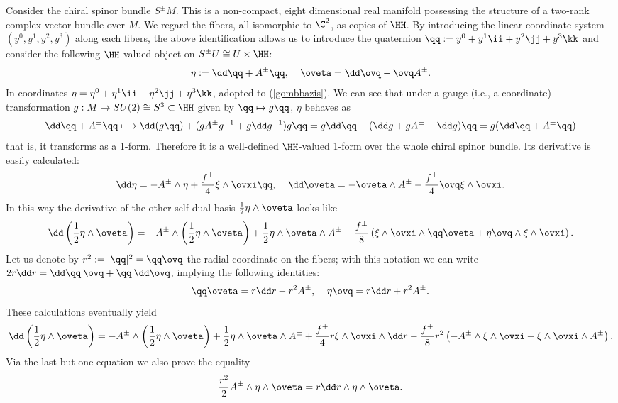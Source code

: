 \documentclass[a4paper,12pt,draft]{article}
\begin{document}
Consider the chiral spinor bundle $S^\pm M$. This is a non-compact, 
eight dimensional real manifold possessing
the structure of a two-rank complex vector bundle over $M$. We regard the 
fibers, all isomorphic to $\C^2$, as copies of $\HH$. By introducing the
linear coordinate system $(y^0, y^1, y^2, y^3)$ along each fibers, the
above identification allows us to introduce the quaternion $\qq
:=y^0+y^1\ii +y^2\jj +y^3\kk$ and consider the following $\HH$-valued
object on $S^\pm U\cong U\times\HH$: 
\[\eta :=\dd\qq +A^\pm\qq,\:\:\:\:\:\oveta =\dd\ovq -\ovq A^\pm .\]
In coordinates $\eta =\eta^0+\eta^1\ii +\eta^2\jj +\eta^3\kk$, adopted to 
(\ref{gombbazis}). We can see that under a gauge (i.e., a coordinate) 
transformation $g: M\rightarrow SU(2)\cong S^3\subset\HH$ given by
$\qq\mapsto g\qq$, $\eta$ behaves as
\[\dd\qq +A^\pm\qq\longmapsto \dd(g\qq )+(gA^\pm g^{-1}+g\dd g^{-1})g\qq
=g\dd\qq +(\dd g +gA^\pm-\dd g)\qq =g(\dd\qq +A^\pm\qq )\]
that is, it transforms as a 1-form. Therefore it is a well-defined 
$\HH$-valued 1-form over the whole chiral spinor bundle. Its derivative
is easily calculated:
\[\dd\eta =-A^\pm\wedge\eta +{f^\pm\over 4}\xi\wedge\ovxi\qq
,\:\:\:\:\:\dd\oveta =-\oveta\wedge A^\pm -{f^\pm\over 4}\ovq\xi\wedge
\ovxi .\]
In this way the derivative of the other self-dual basis
${1\over 2}\eta\wedge\oveta$ looks like 
\[\dd \left({1\over 2}\eta\wedge\oveta\right)
=-A^\pm\wedge\left( {1\over 2}\eta\wedge\oveta\right)+ {1\over
2}\eta\wedge\oveta\wedge A^\pm +{f^\pm\over 
8}\left(\xi\wedge\ovxi\wedge\qq\oveta +\eta\ovq\wedge\xi\wedge\ovxi
\right) .\]
Let us denote by $r^2:=|\qq |^2=\qq\ovq$ the radial coordinate on the
fibers; with this notation we can write $2r\dd r=\dd\qq\:\ovq
+\qq\:\dd\ovq$, implying the following identities:
\[\qq\oveta =r\dd r-r^2A^\pm,\:\:\:\:\:\eta\ovq =r\dd r+r^2A^\pm .\]
These calculations eventually yield
\begin{equation}
\dd \left({1\over 2}\eta\wedge\oveta\right) =
-A^\pm\wedge\left({1\over 2}\eta\wedge\oveta\right) +{1\over
2}\eta\wedge\oveta\wedge A^\pm+{f^\pm\over 4}r\xi\wedge\ovxi\wedge\dd r 
-{f^\pm\over 8}r^2\left( -A^\pm\wedge\xi\wedge\ovxi +\xi\wedge\ovxi\wedge
A^\pm\right) . 
\label{etaderivalt}
\end{equation}
Via the last but one equation we also prove the equality
\begin{equation}
{r^2\over 2}A^\pm\wedge\eta\wedge\oveta =r\dd r\wedge 
\eta\wedge\oveta . 
\label{rkifejezes}
\end{equation}
\end{document}
